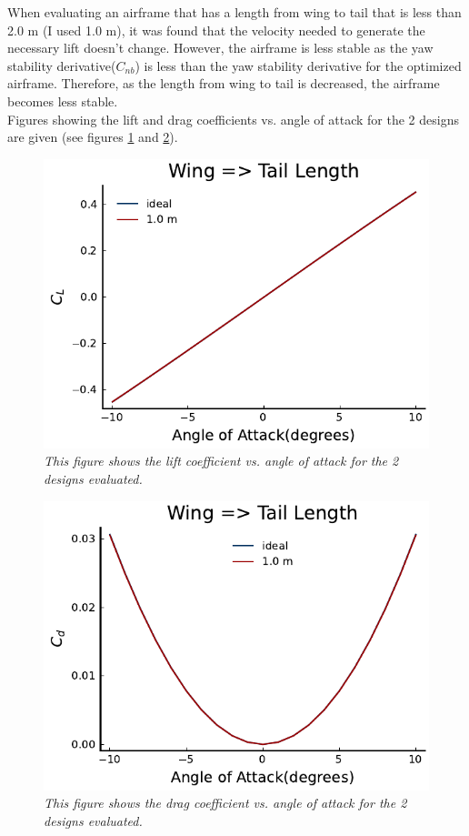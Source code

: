 \documentclass{journal}
\begin{document}
	When evaluating an airframe that has a length from wing to tail that is less than 2.0 m (I used 1.0 m), it was found that the velocity needed to generate the necessary lift doesn't change. However, the airframe is less stable as the yaw stability derivative(\(C_{nb}\)) is less than the yaw stability derivative for the optimized airframe. Therefore, as the length from wing to tail is decreased, the airframe becomes less stable.\\
	
	Figures showing the lift and drag coefficients vs. angle of attack for the 2 designs are given (see figures \ref{fig:wingtail_cl} and \ref{fig:wingtail_cd}). 
	
	\begin{figure}[H]
		\includegraphics{../graphics/wingtail_cl.pdf}
		\caption{\emph{This figure shows the lift coefficient vs. angle of attack for the 2 designs evaluated.}}
		\label{fig:wingtail_cl}
	\end{figure}
	\begin{figure}[H]
		\includegraphics{../graphics/wingtail_cd.pdf}
		\caption{\emph{This figure shows the drag coefficient vs. angle of attack for the 2 designs evaluated.}}
		\label{fig:wingtail_cd}
	\end{figure}
	
\end{document}
